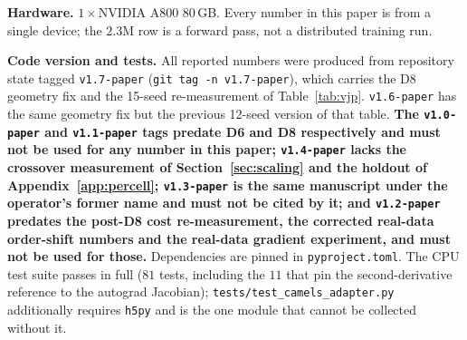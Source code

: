 \noindent\textbf{Hardware.} $1\times$NVIDIA A800 80\,GB. Every number in this paper is from a single
device; the $2.3$M row is a forward pass, not a distributed training run.

\noindent\textbf{Code version and tests.} All reported numbers were produced from repository state
tagged \texttt{v1.7-paper} (\texttt{git tag -n v1.7-paper}), which carries the D8 geometry fix and the
15-seed re-measurement of Table~\ref{tab:vjp}. \texttt{v1.6-paper} has the same geometry fix but the
previous 12-seed version of that table.
\textbf{The \texttt{v1.0-paper} and \texttt{v1.1-paper} tags predate D6 and D8 respectively and must
not be used for any number in this paper; \texttt{v1.4-paper} lacks the crossover measurement of
Section~\ref{sec:scaling} and the holdout of Appendix~\ref{app:percell}; \texttt{v1.3-paper} is
the same manuscript under the operator's former name and must not be cited by it; and
\texttt{v1.2-paper} predates the post-D8 cost
re-measurement,
the corrected real-data order-shift numbers and the real-data gradient experiment, and must not be used
for those.} Dependencies are pinned in \texttt{pyproject.toml}. The CPU
test suite passes in full ($81$ tests, including the $11$ that pin the second-derivative reference to
the autograd Jacobian); \texttt{tests/\allowbreak test\_\allowbreak camels\_\allowbreak adapter.\allowbreak py} additionally requires \texttt{h5py}
and is the one module that cannot be collected without it.

